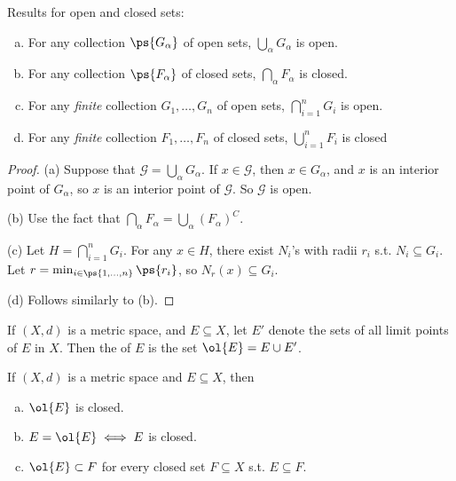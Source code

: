 \documentclass[11pt]{scrartcl}
\numberwithin{equation}{section}
\begin{document}
\begin{theorem}
    Results for open and closed sets:
    \begin{enumerate}[a.]
        \item For any collection $\ps{G_\alpha}$ of open sets,
        $\bigcup_\alpha G_\alpha$ is open.
        \item For any collection $\ps{F_\alpha}$ of closed sets,
        $\bigcap_\alpha F_\alpha$ is closed.
        \item For any \textit{finite} collection 
        $G_1,\dots, G_n$ of open sets,
        $\bigcap_{i=1}^n G_i$ is open.
        \item For any \textit{finite} collection 
        $F_1,\dots, F_n$ of closed sets,
        $\bigcup_{i=1}^n F_i$ is closed
    \end{enumerate}
\end{theorem}
\begin{proof}
    (a) Suppose that $\mathcal G = \bigcup_\alpha G_\alpha$. If $x\in \mathcal G$, then $x \in G_\alpha$, and $x$ is an interior point of 
    $G_\alpha$, so $x$ is an interior point of $\mathcal G$. So 
    $\mathcal{G}$ is open.

    (b) Use the fact that $\bigcap_\alpha F_\alpha = \bigcup_\alpha(F_\alpha)^C$.

    (c) Let $H = \bigcap_{i=1}^n G_i$. For any $x\in H$, there exist $N_i$'s with 
    radii $r_i$ s.t. $N_i\subseteq G_i$. Let $r=\min_{i\in\ps{1,\dots,n}}\ps{r_i}$, so $N_r(x)\subseteq G_i$.
    
    (d) Follows similarly to (b).
\end{proof}

\begin{definition}
    If $(X,d)$ is a metric space, and $E\subseteq X$, let $E'$ denote 
    the sets of all limit points of $E$ in $X$. Then the 
    of $E$ is the set $\ol{E} = E \cup E'$.
\end{definition}

\begin{theorem}
    If $(X,d)$ is a metric space and $E\subseteq X$, then 
    \begin{enumerate}[a.]
        \item $\ol{E}$ is closed.
        \item $E=\ol{E} \iff E$ is closed.
        \item $\ol{E}\subset F$ for every closed set $F\subseteq X$ s.t.   
        $E\subseteq F$.
    \end{enumerate}
\end{theorem}
\end{document}
